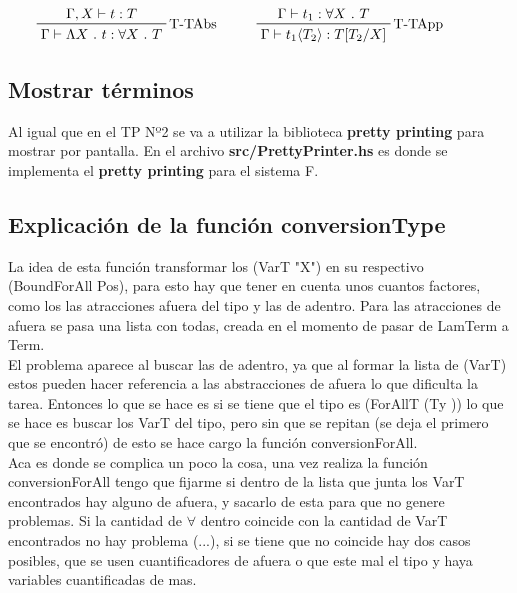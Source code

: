 \documentclass[12pt, titlepage, a4paper]{article}
\begin{document}
\begin{displaymath}
    \prftree[r]{T-TAbs}{\Gamma, X \vdash t : T}{\Gamma \vdash \Lambda X \ . \ t : \forall X \ . \ T} \hspace{1cm}
    \prftree[r]{T-TApp}{\Gamma \vdash t_1 : \forall X \ . \ T}{\Gamma \vdash t_1 \langle T_2 \rangle : T[T_2/X]} \hspace{1cm}
\end{displaymath}

\subsection{Mostrar términos}
Al igual que en el TP Nº2 \cite{tp2:lambdaCalculoSimpleTipado} se va a utilizar la biblioteca \textbf{pretty printing} para mostrar por 
pantalla. En el archivo
\textbf{src/PrettyPrinter.hs} es donde se implementa el \textbf{pretty printing} para el sistema F.

\subsection{Explicación de la función conversionType}
La idea de esta función transformar los (VarT "X") en su respectivo (BoundForAll Pos), para esto hay que tener en cuenta unos cuantos factores, como los las  
atracciones afuera del tipo y las de adentro. Para las atracciones de afuera se pasa una lista con todas, creada en el momento de pasar de LamTerm a Term.\\

El problema aparece al buscar las de adentro, ya que al formar la lista de (VarT) estos pueden hacer referencia a las abstracciones de afuera lo que dificulta la 
tarea. Entonces lo que se hace es si se tiene que el tipo es (ForAllT (Ty )) lo que se hace es buscar los VarT del tipo, pero sin que se repitan (se deja el primero 
que se encontró) de esto se hace cargo la función conversionForAll. \\

Aca es donde se complica un poco la cosa, una vez realiza la función conversionForAll tengo que fijarme si dentro de la lista que junta los VarT encontrados hay alguno 
de afuera, y sacarlo de esta para que no genere problemas. Si la cantidad de $\forall$ dentro coincide con la cantidad de VarT encontrados no hay problema (...), si se 
tiene que no coincide hay dos casos posibles, que se usen cuantificadores de afuera o que este mal el tipo y haya variables cuantificadas de mas.\\
\end{document}

